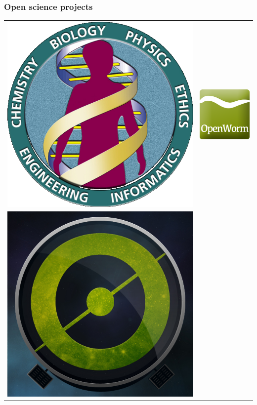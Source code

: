 \begin{frame}\frametitle{Open science projects}
\centering
\begin{tabular}{cc}
	\includegraphics[height=0.3\textheight]{gfx/present/HGP}
	&
	\includegraphics[height=0.3\textheight]{gfx/present/OpenWormLogo}
	\\
	\includegraphics[height=0.3\textheight]{gfx/present/Galaxyzoo}

\end{tabular}
\end{frame}
